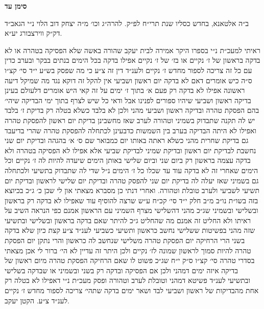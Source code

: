 \documentclass[12pt, openany]{book}
\newcommand{\chapname}{}
\newcommand{\newchap}[1]{
	\addcontentsline{toc}{chapter}{#1}
	\renewcommand{\chapname}{#1}
		\begin{center}
			\textbf{%
\fontsize{16pt}{16pt}\selectfont
				#1}
		\end{center}
}
\begin{document}
\newchap{סימן עד}
\begin{multicols}{2}
ב״ה אלטאנא, בחדש כסליו שנת תרי״ח לפ״ק. להרה״ג וכו׳ מ״ה יצחק דוב הלוי נ״י הגאב״ד דק״ק ווירצבורג יע״א.\\\vspace{0pt}

ראיתי למעכ״ת נ״י בספרו היקר אמירה לבית יעקב שהורה באשה שלא הפסיקה בטהרה או לא בדקה בראשון של ז׳ נקיים או בז׳ של ז׳ נקיים אפילו בדקה בכל הימים בנתים בבקר ובערב כדין עם כל זה צריכה לספור מחדש ז׳ נקיים ולענ״ד דין זה צ״ע כי מה שפסק בש״ע י״ד סי׳ קצ״ו ס״ה כיש אומרים דאם לא בדקה יום ראשון ושביעי אין להקל זה דוקא נגד מה שמיקל דיעה ראשונה אפילו לא בדקה רק פעם א׳ בתוך ז׳ ימים על זה קאי היש אומרים דלעולם בעינן בדיקה ראשון ושביעי שיהיו ספורים לפנינו אבל ודאי כל שיש לצרף בתוך ימי הבדיקה שיהי׳ בהם הפסקת טהרה ובדיקה ראשון ושביעי מהני ולכן לא בלבד כשלא בטלה רק בדיקת ז׳ בלבד יש לה תקנה שתבדוק בשמיני וטהורה לערב שאז מחשבינן בדיקת יום ראשון להפסקת טהרה ואפילו לא היתה הבדיקה בערב בין השמשות כדבעינן לכתחלה להפסקת טהרה שהרי בדיעבד גם בדיקת שחרית מהני כשלא ראתה באותו יום כמבואר שם ס׳ א׳ בהגהה ובדיקת יום שני נחשבת לבדיקת יום ראשון ובדיקת שמיני לבדיקת שביעי אלא אפילו לא הפסיקה בטהרה ולא בדקה עצמה בראשון רק ביום שני וביום שלישי באותן הימים שיעדה להיות לה ז׳ נקיים וכל הימים שאחרי זה לא בדקה עוד עד שכלו כל ז׳ הימים נ״ל שדי לה שתבדוק בתשיעי ולכתחלה גם בשמיני שאז יעלה לה בדיקת יום שני להפסק טהרה ובדיקת יום שלישי לראשון ובדיקת יום תשיעי לשביעי ולערב טובלת וטהורה. ואחרי דנתי כן מסברא מצאתי און לי שכן כ׳ ג״כ בכיוצא בזה בשו״ת נו״ב מ״ב חלק י״ד סי׳ קכ״ח ע״ש שרצה להוסיף עוד שאפילו לא בדקה רק בראשון ובשלישי ובשמיני שג״כ מהני דהשלישי מצרף השמיני עם הראשון אמנם כפי הנראה השיב על ראיתו ולא החליט זה אמנם מה שהחליט ג״כ להיתר שאם בדקה בראשון ובשלישי ובתשיעי שזה מהני בפשיטות ששלישי נחשב כראשון ותשיעי כשביעי לענ״ד צ״ע קצת כיון שלא בדקה בשני הרי הרחיקה יום הפסקת טהרה משלישי שנחשב לה כראשון והרי נתקן יום הפסקת טהרה להיות סמוך לראשון שמונה לז׳ נקיים ולכן היתר זה עדיין לא הי׳ ברור לי אכן מצאתי בסדרי טהרה סי׳ קצ״ו ס״ק י״ח שג״כ פשוט לו שאם הרחיקה הפסקת טהרה מיום ראשון של בדיקה איזה ימים דמהני ולכן אם הפסיקה ובדקה רק בשני ובשמיני או שבדקה בשלישי ובתשיעי לענ״ד פשיטא דמהני וטובלת לערב וטהורה ופסק מעכ״ת נ״י דאפילו לא בטלה רק אחת מהבדיקות של ראשון ושביעי לבד ושאר ימים בדקה שתהי׳ צריכה לספור מחדש ז׳ נקיים לענ״ד צ״ע. הקטן יעקב.\\\vspace{0pt}

\end{multicols}\newpage
\end{document}
